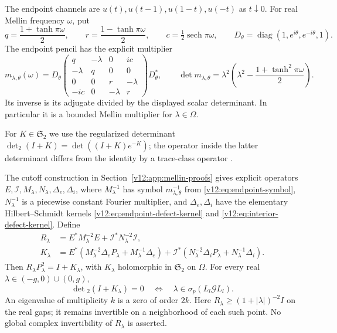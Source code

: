 The endpoint channels are $u(t),u(t-1),u(1-t),u(-t)$ as $t\downarrow0$.
For real Mellin frequency $\omega$, put
\[
 q=\frac{1+\tanh\pi\omega}{2},\qquad
 r=\frac{1-\tanh\pi\omega}{2},\qquad
 c=\tfrac12\operatorname{sech}\pi\omega,
 \qquad D_\theta=\operatorname{diag}(1,e^{i\theta},e^{-i\theta},1).
\]
The endpoint pencil has the explicit multiplier
\begin{equation}\label{v12:eq:endpoint-symbol}
 m_{\lambda,\theta}(\omega)=D_\theta
 \begin{pmatrix}
 q&-\lambda&0&ic\\-\lambda&q&0&0\\
 0&0&r&-\lambda\\-ic&0&-\lambda&r
 \end{pmatrix}D_\theta^*,\qquad
 \det m_{\lambda,\theta}
 =\lambda^2\left(\lambda^2-\frac{1+\tanh^2\pi\omega}{2}\right).
\end{equation}
Its inverse is its adjugate divided by the displayed scalar determinant.
In particular it is a bounded Mellin multiplier for $\lambda\in\Omega$.

For $K\in\mathfrak S_2$ we use the regularized determinant
$\det_2(I+K)=\det((I+K)e^{-K})$; the operator inside the latter
determinant differs from the identity by a trace-class operator
\cite[Chapter~9]{Simon2005}.

\begin{theorem}
\label{v12:thm:explicit-gap-equation}
The cutoff construction in Section~\ref{v12:app:mellin-proofs} gives
explicit operators $E,\mathcal I,M_\lambda,N_\lambda,\Delta_e,\Delta_i$, where
$M_\lambda^{-1}$ has symbol $m_{\lambda,\theta}^{-1}$ from
\eqref{v12:eq:endpoint-symbol}, $N_\lambda^{-1}$ is a piecewise constant
Fourier multiplier, and $\Delta_e,\Delta_i$ have the elementary
Hilbert--Schmidt kernels \eqref{v12:eq:endpoint-defect-kernel} and
\eqref{v12:eq:interior-defect-kernel}.  Define
\begin{align}
 R_\lambda&=E^*M_\lambda^{-2}E+\mathcal I^*N_\lambda^{-2}\mathcal I,\nonumber\\
 K_\lambda&=E^*(M_\lambda^{-2}\Delta_eP_\lambda
                          +M_\lambda^{-1}\Delta_e)
          +\mathcal I^*(N_\lambda^{-2}\Delta_iP_\lambda
                          +N_\lambda^{-1}\Delta_i).
 \label{v12:eq:explicit-preconditioner}
\end{align}
Then $R_\lambda P_\lambda^2=I+K_\lambda$, with $K_\lambda$ holomorphic
in $\mathfrak S_2$ on $\Omega$.  For every real
$\lambda\in(-g,0)\cup(0,g)$,
\begin{equation}\label{v12:eq:scalar-quantization}
 \det{}_2(I+K_\lambda)=0
 \quad\Longleftrightarrow\quad
 \lambda\in\sigma_p(L_l\mathcal G L_l).
\end{equation}
An eigenvalue of multiplicity $k$ is a zero of order $2k$.
Here $R_\lambda\ge(1+|\lambda|)^{-2}I$ on the real gaps; it remains
invertible on a neighborhood of each such point.  No global complex
invertibility of $R_\lambda$ is asserted.
\end{theorem}

